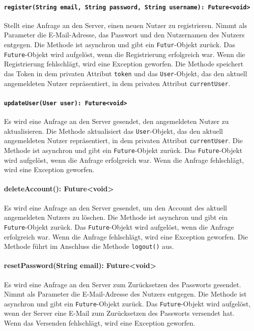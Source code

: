 \documentclass{entwurfsheft}
\begin{document}
\paragraph{\texttt{register(String email, String password, String username): Future<void>}}
Stellt eine Anfrage an den Server, einen neuen Nutzer zu registrieren. Nimmt als Parameter die E-Mail-Adresse, das Passwort und den Nutzernamen des Nutzers entgegen. Die Methode ist asynchron und gibt ein \texttt{Futur}-Objekt zurück. Das \texttt{Future}-Objekt wird aufgelöst, wenn die Registrierung erfolgreich war. Wenn die Registrierung fehlschlägt, wird eine Exception geworfen. Die Methode speichert das Token in dem privaten Attribut \texttt{token} und das \texttt{User}-Objekt, das den aktuell angemeldeten Nutzer repräsentiert, in dem privaten Attribut \texttt{currentUser}.
\paragraph{\texttt{updateUser(User user): Future<void>}}
Es wird eine Anfrage an den Server gesendet, den angemeldeten Nutzer zu aktualisieren. Die Methode aktualisiert das \texttt{User}-Objekt, das den aktuell angemeldeten Nutzer repräsentiert, in dem privaten Attribut \texttt{currentUser}.
Die Methode ist asynchron und gibt ein \texttt{Future}-Objekt zurück. Das \texttt{Future}-Objekt wird aufgelöst, wenn die Anfrage erfolgreich war. Wenn die Anfrage fehlschlägt, wird eine Exception geworfen.
\paragraph{deleteAccount(): Future<void>}
Es wird eine Anfrage an den Server gesendet, um den Account des aktuell angemeldeten Nutzers zu löschen. Die Methode ist asynchron und gibt ein \texttt{Future}-Objekt zurück. Das \texttt{Future}-Objekt wird aufgelöst, wenn die Anfrage erfolgreich war. Wenn die Anfrage fehlschlägt, wird eine Exception geworfen. Die Methode führt im Anschluss die Methode \texttt{logout()} aus.
\paragraph{resetPassword(String email): Future<void>}
Es wird eine Anfrage an den Server zum Zurücksetzen des Passworts gesendet. Nimmt als Parameter die E-Mail-Adresse des Nutzers entgegen. Die Methode ist asynchron und gibt ein \texttt{Future}-Objekt zurück. Das \texttt{Future}-Objekt wird aufgelöst, wenn der Server eine E-Mail zum Zurücksetzen des Passworts versendet hat. Wenn das Versenden fehlschlägt, wird eine Exception geworfen.
\end{document}
